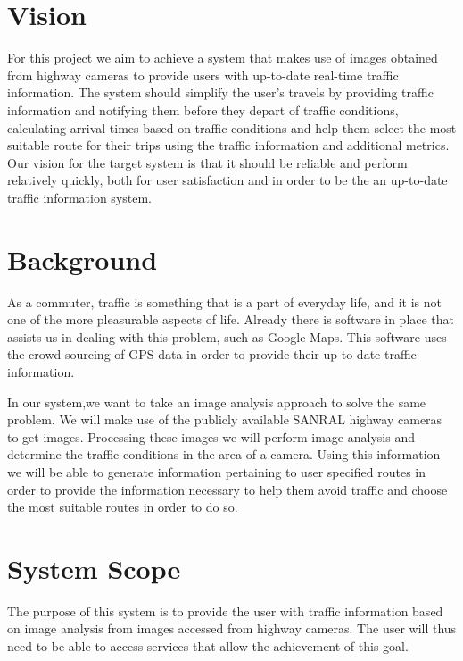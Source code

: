\documentclass[a4paper,12pt]{article}
\begin{document}
\section{Vision}
For this project we aim to achieve a system that makes use of images obtained from highway cameras to provide users with up-to-date real-time traffic information. The system should simplify the user's travels by providing traffic information and notifying them before they depart of traffic conditions, calculating arrival times based on traffic conditions and help them select the most suitable route for their trips using the traffic information and additional metrics. Our vision for the target system is that it should be reliable and perform relatively quickly, both for user satisfaction and in order to be the an up-to-date traffic information system.
\section{Background}
As a commuter, traffic is something that is a part of everyday life, and it is not one of the more pleasurable aspects of life. Already there is software in place that assists us in dealing with this problem, such as Google Maps. This software uses the crowd-sourcing of GPS data in order to provide their up-to-date traffic information.

In our system,we want to take an image analysis approach to solve the same problem. We will make use of the publicly available SANRAL highway cameras to get images. Processing these images we will perform image analysis and determine the traffic conditions in the area of a camera. Using this information we will be able to generate information pertaining to user specified routes in order to provide the information necessary to help them avoid traffic and choose the most suitable routes in order to do so.
\section{System Scope}
The purpose of this system is to provide the user with traffic information based on image analysis from images accessed from highway cameras. The user will thus need to be able to access services that allow the achievement of this goal.
\end{document}
